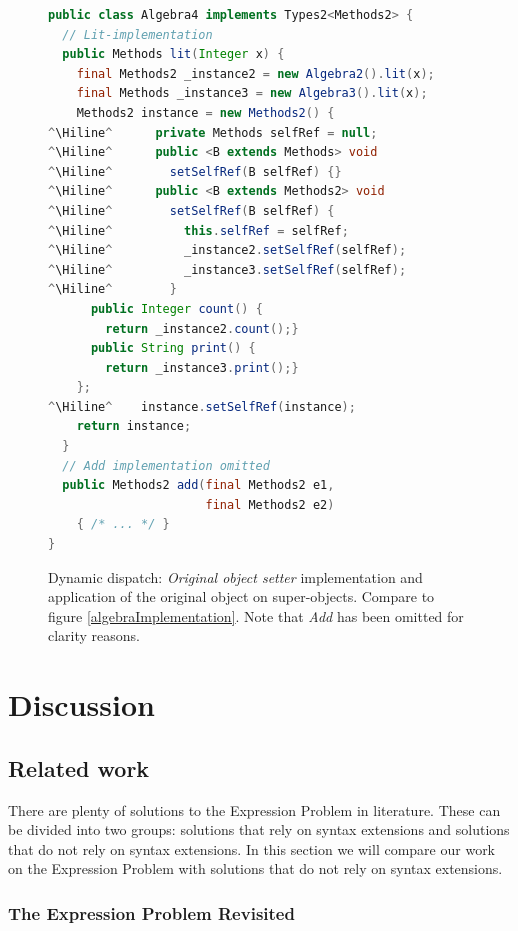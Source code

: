 \documentclass{report}
\newcommand{\Hiline}{\makebox[0pt][l]{\color[rgb]{1,0.96,0.98}\rule[-4pt]{\linewidth}{12.5pt}}}
\begin{document}
\begin{figure}[H]
\begin{lstlisting}[language=java]
public class Algebra4 implements Types2<Methods2> {
  // Lit-implementation
  public Methods lit(Integer x) {
    final Methods2 _instance2 = new Algebra2().lit(x);
    final Methods _instance3 = new Algebra3().lit(x);
    Methods2 instance = new Methods2() {
^\Hiline^      private Methods selfRef = null;
^\Hiline^      public <B extends Methods> void
^\Hiline^        setSelfRef(B selfRef) {}
^\Hiline^      public <B extends Methods2> void
^\Hiline^        setSelfRef(B selfRef) {
^\Hiline^          this.selfRef = selfRef;
^\Hiline^          _instance2.setSelfRef(selfRef);
^\Hiline^          _instance3.setSelfRef(selfRef);
^\Hiline^        }
      public Integer count() {
        return _instance2.count();}
      public String print() {
        return _instance3.print();}
    };
^\Hiline^    instance.setSelfRef(instance);
    return instance;
  }
  // Add implementation omitted
  public Methods2 add(final Methods2 e1,
                      final Methods2 e2)
    { /* ... */ }
}
\end{lstlisting}
\caption{Dynamic dispatch: \emph{Original object setter} implementation and application of the original object on super-objects. Compare to figure \ref{algebraImplementation}. Note that \emph{Add} has been omitted for clarity reasons.}
\label{dynamicDispatchAlgebra}
\end{figure}

\section{Discussion}

\subsection{Related work}

There are plenty of solutions to the Expression Problem in literature. These can be divided into two groups: solutions that rely on syntax extensions and solutions that do not rely on syntax extensions. In this section we will compare our work on the Expression Problem with solutions that do not rely on syntax extensions.

\subsubsection*{The Expression Problem Revisited}
\end{document}
